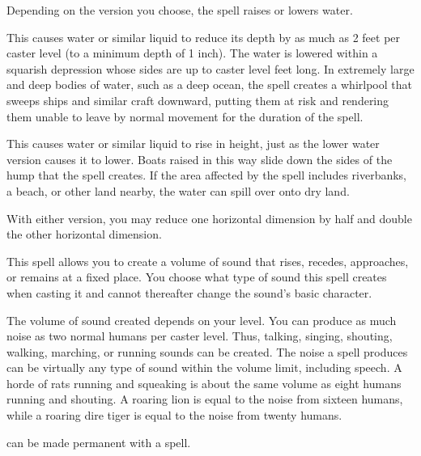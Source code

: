 \spellrng{\rngfar}
\begin{spelleffect}
  Depending on the version you choose, the  spell raises or lowers water.
  \par {} This causes water or similar liquid to reduce its depth by as much as 2 feet per caster level (to a minimum depth of 1 inch). The water is lowered within a squarish depression whose sides are up to caster level  feet long. In extremely large and deep bodies of water, such as a deep ocean, the spell creates a whirlpool that sweeps ships and similar craft downward, putting them at risk and rendering them unable to leave by normal movement for the duration of the spell.
  \par {} This causes water or similar liquid to rise in height, just as the lower water version causes it to lower. Boats raised in this way slide down the sides of the hump that the spell creates. If the area affected by the spell includes riverbanks, a beach, or other land nearby, the water can spill over onto dry land.
\end{spelleffect}
\begin{spellnotes}
  With either version, you may reduce one horizontal dimension by half and double the other horizontal dimension.
\end{spellnotes}

\spellrng{\rngclose}
\begin{spelleffect}
  This spell allows you to create a volume of sound that rises, recedes, approaches, or remains at a fixed place. You choose what type of sound this spell creates when casting it and cannot thereafter change the sound's basic character.
  \par The volume of sound created depends on your level. You can produce as much noise as two normal humans per caster level. Thus, talking, singing, shouting, walking, marching, or running sounds can be created. The noise a  spell produces can be virtually any type of sound within the volume limit, including speech. A horde of rats running and squeaking is about the same volume as eight humans running and shouting. A roaring lion is equal to the noise from sixteen humans, while a roaring dire tiger is equal to the noise from twenty humans.
\end{spelleffect}
\begin{spellnotes}
   can be made permanent with a  spell.
\end{spellnotes}

